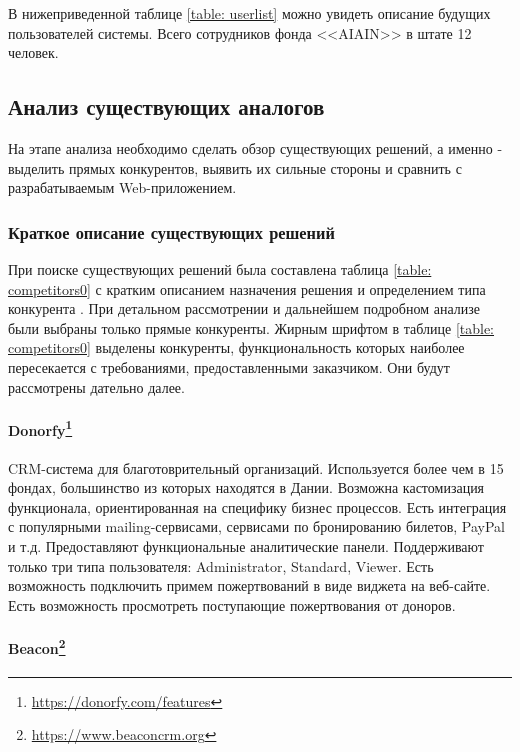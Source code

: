 \documentclass[a4paper,12pt,reqno]{article}
\begin{document}
В нижеприведенной таблице \ref{table: userlist} можно увидеть описание будущих пользователей системы. Всего сотрудников фонда <<AIAIN>> в штате 12 человек.



\subsection{Анализ существующих аналогов}

На этапе анализа необходимо сделать обзор существующих решений, а именно - выделить прямых конкурентов, выявить их сильные стороны и сравнить с разрабатываемым Web-приложением. 

\subsubsection{Краткое описание существующих решений}

При поиске существующих решений была составлена таблица \ref{table: competitors0} с кратким описанием назначения решения и определением типа конкурента \cite{competitors}. При детальном рассмотрении и дальнейшем подробном анализе были выбраны только прямые конкуренты. Жирным шрифтом в таблице \ref{table: competitors0} выделены конкуренты, функциональность которых наиболее пересекается с требованиями, предоставленными заказчиком. Они будут рассмотрены дательно далее.




\paragraph*{Donorfy\footnote{\url{https://donorfy.com/features}}\\}

CRM-система для благотоврительный организаций. Используется более чем в 15 фондах, большинство из которых находятся в Дании. Возможна кастомизация функционала, ориентированная на специфику бизнес процессов. Есть интеграция с популярными mailing-сервисами, сервисами по бронированию билетов, PayPal и т.д. Предоставляют функциональные аналитические панели. Поддерживают только три типа пользователя: Administrator, Standard, Viewer. Есть возможность подключить примем пожертвований в виде виджета на веб-сайте. Есть возможность просмотреть поступающие пожертвования от доноров.

\paragraph*{Beacon\footnote{\url{https://www.beaconcrm.org}}\\}
\end{document}
